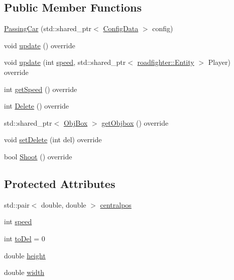 \subsection*{Public Member Functions}
\begin{DoxyCompactItemize}
\item 
\hyperlink{classroadfighter_1_1PassingCar_a2f3ae2000521dabcd282f9538b0c87be}{Passing\+Car} (std\+::shared\+\_\+ptr$<$ \hyperlink{classConfigData}{Config\+Data} $>$ config)
\item 
void \hyperlink{classroadfighter_1_1PassingCar_a45276fb9270a145fed9a7827a9ab7a46}{update} () override
\item 
void \hyperlink{classroadfighter_1_1PassingCar_af0667cf430382117beb4669777905cc7}{update} (int \hyperlink{classroadfighter_1_1PassingCar_a7b35bee0a1fd977770e98672583991c5}{speed}, std\+::shared\+\_\+ptr$<$ \hyperlink{classroadfighter_1_1Entity}{roadfighter\+::\+Entity} $>$ Player) override
\item 
int \hyperlink{classroadfighter_1_1PassingCar_afae62d9c6037d5ce8f74bb2e2ed363ac}{get\+Speed} () override
\item 
int \hyperlink{classroadfighter_1_1PassingCar_a1a2838de0992a6e46793d0fe0f128b36}{Delete} () override
\item 
std\+::shared\+\_\+ptr$<$ \hyperlink{structObjBox}{Obj\+Box} $>$ \hyperlink{classroadfighter_1_1PassingCar_aeee1f7e16dcef7adc0a4bea629b0d42b}{get\+Objbox} () override
\item 
void \hyperlink{classroadfighter_1_1PassingCar_aad1905fcb427945c3300840deedffb1d}{set\+Delete} (int del) override
\item 
bool \hyperlink{classroadfighter_1_1PassingCar_a16df11cb6ac5ce29b733d1063490c95c}{Shoot} () override
\end{DoxyCompactItemize}
\subsection*{Protected Attributes}
\begin{DoxyCompactItemize}
\item 
std\+::pair$<$ double, double $>$ \hyperlink{classroadfighter_1_1PassingCar_aa9ba790b7ce315a2b914814b9f4de68a}{centralpos}
\item 
int \hyperlink{classroadfighter_1_1PassingCar_a7b35bee0a1fd977770e98672583991c5}{speed}
\item 
int \hyperlink{classroadfighter_1_1PassingCar_aa1607598fb0724778dc38404313a5b6c}{to\+Del} = 0
\item 
double \hyperlink{classroadfighter_1_1PassingCar_a3fb050dc05c6c20e776ea167a31b199b}{height}
\item 
double \hyperlink{classroadfighter_1_1PassingCar_a5168bee8ec5bd08cd42599738d20ccab}{width}
\end{DoxyCompactItemize}



